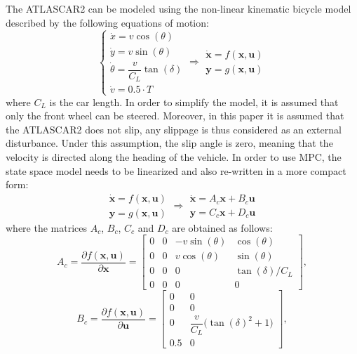 \documentclass[conference, 11pt]{IEEEtran}
\begin{document}
The ATLASCAR2 can be modeled using the non-linear kinematic bicycle model described by the following equations of motion:
\begin{equation*}
\label{eqn:dynamics_model_obstacle_avoidance}
\left \{ \begin{array}{llll}
\dot{x} = v\cos(\theta)\\
\dot{y} = v\sin(\theta)\\
\dot{\theta} =\dfrac{v}{C_L}\tan(\delta)\\
\dot{v} =0.5 \cdot T
\end{array} 
\right .
\Longrightarrow 
\begin{array}{llll}
\dot{\textbf{x}} = f(\textbf{x},\textbf{u})\\
\textbf{y} = g(\textbf{x},\textbf{u})
\end{array}
\end{equation*}
where $C_L$ is the car length. In order to simplify the model, it is assumed that only the front wheel can be steered. Moreover, in this paper it is assumed that the ATLASCAR2 does not slip, any slippage is thus considered as an external disturbance. Under this assumption, the slip angle is zero, meaning that the velocity is directed along the heading of the vehicle. In order to use MPC, the state space model needs to be linearized and also re-written in a more compact form:
\begin{equation}
\label{eqn:dynamics_model_non_linear}
\begin{array}{llll}
\dot{\textbf{x}} = f(\textbf{x},\textbf{u})\\
\textbf{y} = g(\textbf{x},\textbf{u})
\end{array} \Longrightarrow
\begin{array}{ll}
\dot{\textbf{x}} =A_c \textbf{x}+ B_c \textbf{u}\\
\textbf{y} =C_c \textbf{x} + D_c \textbf{u}
\end{array}
\end{equation}
where the matrices $A_c$, $B_c$, $C_c$ and $D_c$ are obtained as follows:
\[ 
A_c=\frac{\partial f(\textbf{x},\textbf{u})}{\partial \textbf{x}}=\begin{bmatrix}
0&0&-v\sin(\theta)&\cos(\theta)\\
0&0&v\cos(\theta)&\sin(\theta)\\
0&0&0&\tan(\delta)/C_L\\
0&0&0&0
\end{bmatrix},
\]
\[
B_c=\frac{\partial f(\textbf{x},\textbf{u})}{\partial \textbf{u}}=\begin{bmatrix}
0&0\\
0&0\\
0&\dfrac{v}{C_L}\big(\tan(\delta)^2+1\big)\\
0.5&0
\end{bmatrix},
\]
\end{document}
